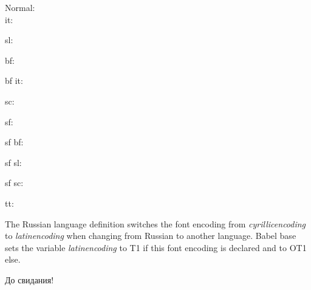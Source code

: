 \documentclass[a4paper]{scrartcl}
\begin{document}
\begin{description}
  \item [Normal:] \teststring

  \item [it:] \textit{\teststring}

  \item [sl:] \textsl{\teststring}

  \item [bf:] \textbf{\teststring}

  \item [bf it:] \textbf{\textit\teststring}

  \item [sc:] \textsc{\teststring}


  \item [sf:] \textsf{\teststring}

  \item [sf bf:] \textsf{\textbf\teststring}

  \item [sf sl:] \textsf{\textsl\teststring}

  \item [sf sc:] \textsf{\textsc\teststring}

  \item [tt:] \texttt{\teststring}

\end{description}


The Russian language definition switches the font encoding from
\emph{cyrillicencoding} to \emph{latinencoding} when changing from Russian
to another language. Babel base sets the variable \emph{latinencoding} to T1
if this font encoding is declared and to OT1 else.


До свидания!
\end{document}
